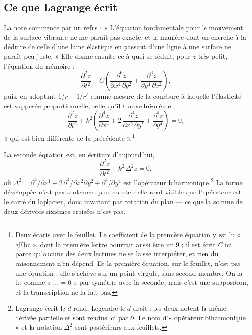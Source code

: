\documentclass[11pt,a4paper]{article}
\begin{document}
\subsection*{Ce que Lagrange écrit}

La note commence par un refus : « L'équation fondamentale pour le mouvement de
la surface vibrante ne me paraît pas exacte, et la manière dont on cherche à
la déduire de celle d'une lame élastique en passant d'une ligne à une surface
ne paraît peu juste. » Elle donne ensuite ce à quoi se réduit, pour $z$ très
petit, l'équation du mémoire :
\[
  \frac{\partial^2 z}{\partial t^2}
  + C\left(\frac{\partial^6 z}{\partial x^4\,\partial y^2}
         + \frac{\partial^6 z}{\partial y^4\,\partial x^2}\right),
\]
puis, en adoptant $1/r + 1/r'$ comme mesure de la courbure à laquelle
l'élasticité est supposée proportionnelle, celle qu'il trouve lui-même :
\[
  \frac{\partial^2 z}{\partial t^2}
  + k^2\left(\frac{\partial^4 z}{\partial x^4}
           + 2\,\frac{\partial^4 z}{\partial x^2\,\partial y^2}
           + \frac{\partial^4 z}{\partial y^4}\right) = 0,
\]
« qui est bien différente de la précédente ».\footnote{Deux écarts avec le
feuillet. Le coefficient de la première équation y est lu « gEbc », dont la
première lettre pourrait aussi être un 9 ; il est écrit $C$ ici parce qu'aucune
des deux lectures ne se laisse interpréter, et rien du raisonnement n'en
dépend. Et la première équation, sur le feuillet, n'est pas une équation : elle
s'achève sur un point-virgule, sans second membre. On la lit comme
« $\dots = 0$ » par symétrie avec la seconde, mais c'est une supposition, et la
transcription ne la fait pas.}

La seconde équation est, en écriture d'aujourd'hui,
\[
  \frac{\partial^2 z}{\partial t^2} + k^2\,\Delta^2 z = 0,
\]
où $\Delta^2 = \partial^4/\partial x^4 + 2\,\partial^4/\partial x^2\partial y^2
+ \partial^4/\partial y^4$ est l'opérateur biharmonique.\footnote{Lagrange
écrit le $d$ rond, Legendre le $d$ droit ; les deux notent la même dérivée
partielle et sont rendus ici par $\partial$. Le nom d'« opérateur
biharmonique » et la notation $\Delta^2$ sont postérieurs aux feuillets.} La
forme développée n'est pas seulement plus courte : elle rend visible que
l'opérateur est le carré du laplacien, donc invariant par rotation du plan —
ce que la somme de deux dérivées sixièmes croisées n'est pas.
\end{document}
